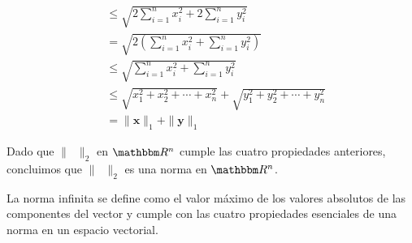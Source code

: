 \begin{examplebox}{}{}
\begin{enumerate}[label=\roman*), topsep=6pt, itemsep=0pt]
\begin{align*}
            & \leq \sqrt{2\sum_{i=1}^{n} x_i^2 + 2\sum_{i=1}^{n} y_i^2} \\
            & = \sqrt{2 \left( \sum_{i=1}^{n} x_i^2 + \sum_{i=1}^{n} y_i^2 \right)} \\
            & \leq \sqrt{\sum_{i=1}^{n} x_i^2 + \sum_{i=1}^{n} y_i^2} \\
            & \leq \sqrt{x_1^2 + x_2^2 + \cdots + x_n^2} + \sqrt{y_1^2 + y_2^2 + \cdots + y_n^2} \\
            & = \| \mathbf{x} \|_1 + \| \mathbf{y} \|_1
        \end{align*}
    \end{enumerate}
    Dado que $\| \phantom{x} \|_2$ en $\RR[n]$ cumple las cuatro propiedades anteriores, concluimos que $\| \phantom{x} \|_2$ es una norma en $\RR[n]$.
\end{examplebox}

\newpage

La norma infinita se define como el valor máximo de los valores absolutos de las componentes del vector y cumple con las cuatro propiedades esenciales de una norma en un espacio vectorial.

